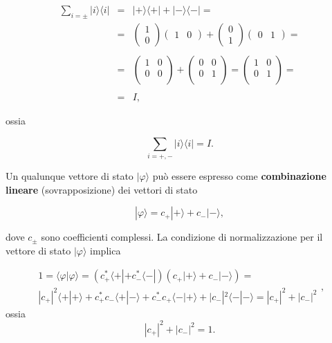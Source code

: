 \begin{eqnarray}
\sum \limits_{i=\pm} | i \rangle \langle i |  & = & | + \rangle \langle + |  + | - \rangle \langle - |  = \nonumber \\
& = &\begin{pmatrix}
1 \\
0
\end{pmatrix}
\begin{pmatrix}
1 & 0
\end{pmatrix} + 
\begin{pmatrix}
0 \\
1
\end{pmatrix}
\begin{pmatrix}
0 & 1
\end{pmatrix}= \nonumber  \\
\nonumber \\
& = & \begin{pmatrix}
1 & 0 \\
0 & 0 \\
\end{pmatrix}+
\begin{pmatrix}
0 & 0 \\
0 & 1 \\
\end{pmatrix}=
\begin{pmatrix}
1 & 0 \\
0 & 1 \\
\end{pmatrix}= \nonumber \\
\nonumber \\
& = & I  ,
\end{eqnarray}

ossia

\begin{equation}
\sum \limits_{i=+,-} | i \rangle \langle i | = I .
\end{equation}

Un qualunque vettore di stato $| \varphi \rangle $ può essere espresso come \textbf{combinazione lineare} (sovrapposizione) dei vettori di stato

\begin{equation}
| \varphi \rangle = c_+ | + \rangle + c_- | - \rangle ,
\end{equation}

dove $c_{\pm}$ sono coefficienti complessi. La condizione di normalizzazione per il vettore di stato $ | \varphi \rangle $ implica

\begin{equation}
\begin{array}{c}
1=\langle \varphi | \varphi \rangle = (c^*_+\langle + | +c^*_- \langle - |)(c_+| + \rangle +c_- | - \rangle)=\\
| c_+|^2\langle + | + \rangle +c^*_+c_- \langle + | - \rangle +c^*_-c_+ \langle - | + \rangle +|c_-|^2 \langle - | - \rangle =|c_+|^2+|c_-|^2
\end{array} ,
\end{equation}
ossia 
\begin{equation}
|c_+|^2+|c_-|^2=1 .
\end{equation}

